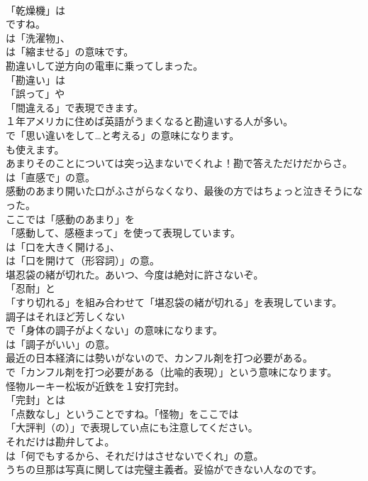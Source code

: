 \documentclass[8pt]{extreport}
\begin{document}
\begin{CJK}{UTF8}{min}
\\	「乾燥機」は
\\	ですね。
\\	は「洗濯物」、
\\	は「縮ませる」の意味です。	
\\	勘違いして逆方向の電車に乗ってしまった。 
\\	「勘違い」は
\\	「誤って」や
\\	「間違える」で表現できます。	
\\	１年アメリカに住めば英語がうまくなると勘違いする人が多い。 
\\	で「思い違いをして…と考える」の意味になります。
\\	も使えます。	
\\	あまりそのことについては突っ込まないでくれよ！勘で答えただけだからさ。 
\\	は「直感で」の意。	
\\	感動のあまり開いた口がふさがらなくなり、最後の方ではちょっと泣きそうになった。 
\\	ここでは「感動のあまり」を
\\	「感動して、感極まって」を使って表現しています。
\\	は「口を大きく開ける」、
\\	は「口を開けて（形容詞）」の意。	
\\	堪忍袋の緒が切れた。あいつ、今度は絶対に許さないぞ。 
\\	「忍耐」と
\\	「すり切れる」を組み合わせて「堪忍袋の緒が切れる」を表現しています。	
\\	調子はそれほど芳しくない 
\\	で「身体の調子がよくない」の意味になります。
\\	は「調子がいい」の意。	
\\	最近の日本経済には勢いがないので、カンフル剤を打つ必要がある。 
\\	で「カンフル剤を打つ必要がある（比喩的表現）」という意味になります。	
\\	怪物ルーキー松坂が近鉄を１安打完封。 
\\	「完封」とは
\\	「点数なし」ということですね。「怪物」をここでは
\\	「大評判（の）」で表現してい点にも注意してください。	
\\	それだけは勘弁してよ。 
\\	は「何でもするから、それだけはさせないでくれ」の意。	
\\	うちの旦那は写真に関しては完璧主義者。妥協ができない人なのです。 

\end{CJK}
\end{document}
